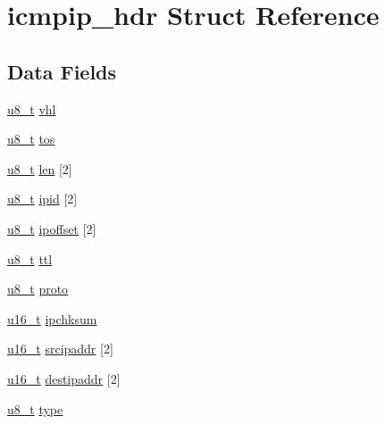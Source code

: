 \hypertarget{structicmpip__hdr}{
\section{icmpip\_\-hdr Struct Reference}
\label{structicmpip__hdr}
}
\subsection*{Data Fields}
\begin{DoxyCompactItemize}
\item 
\hyperlink{group__uipfw_ga4caecabca98b43919dd11be1c0d4cd8e}{u8\_\-t} \hyperlink{structicmpip__hdr_afdf7a84b0cb277c672ea4f53346465b1}{vhl}
\item 
\hyperlink{group__uipfw_ga4caecabca98b43919dd11be1c0d4cd8e}{u8\_\-t} \hyperlink{structicmpip__hdr_ad87c22fa359c38406c1aa1928ddba3b3}{tos}
\item 
\hyperlink{group__uipfw_ga4caecabca98b43919dd11be1c0d4cd8e}{u8\_\-t} \hyperlink{structicmpip__hdr_add2b8a5dbb5175b67f271e7911100054}{len} \mbox{[}2\mbox{]}
\item 
\hyperlink{group__uipfw_ga4caecabca98b43919dd11be1c0d4cd8e}{u8\_\-t} \hyperlink{structicmpip__hdr_ac26fe184c31c51b43bd2ec2848c6e42b}{ipid} \mbox{[}2\mbox{]}
\item 
\hyperlink{group__uipfw_ga4caecabca98b43919dd11be1c0d4cd8e}{u8\_\-t} \hyperlink{structicmpip__hdr_abd881d3f70a42f53f92bd3dcdc35b4dd}{ipoffset} \mbox{[}2\mbox{]}
\item 
\hyperlink{group__uipfw_ga4caecabca98b43919dd11be1c0d4cd8e}{u8\_\-t} \hyperlink{structicmpip__hdr_a6c843562192e126e97c8a694f676e251}{ttl}
\item 
\hyperlink{group__uipfw_ga4caecabca98b43919dd11be1c0d4cd8e}{u8\_\-t} \hyperlink{structicmpip__hdr_a96faf59c682cc8ae079e891d75e06146}{proto}
\item 
\hyperlink{group__uipfw_ga77570ac4fcab86864fa1916e55676da2}{u16\_\-t} \hyperlink{group__uipfw_ga937e9a7c3241a3db558d51ade5d5336d}{ipchksum}
\item 
\hyperlink{group__uipfw_ga77570ac4fcab86864fa1916e55676da2}{u16\_\-t} \hyperlink{group__uipfw_ga50b8789dde802ca4ed0a4a81949d8397}{srcipaddr} \mbox{[}2\mbox{]}
\item 
\hyperlink{group__uipfw_ga77570ac4fcab86864fa1916e55676da2}{u16\_\-t} \hyperlink{group__uipfw_gaf0f2e793d08337d303a01ef9ce681a86}{destipaddr} \mbox{[}2\mbox{]}
\item 
\hyperlink{group__uipfw_ga4caecabca98b43919dd11be1c0d4cd8e}{u8\_\-t} \hyperlink{group__uipfw_gacd2da996a99d67c9bd3d19d619206087}{type}

\end{DoxyCompactItemize}
